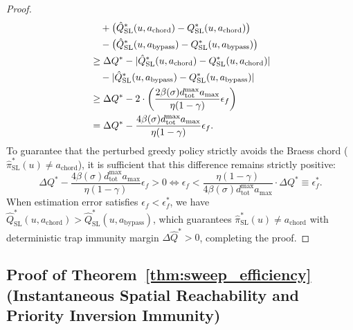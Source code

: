 \documentclass[11pt,a4paper]{article}
\begin{document}
\begin{proof}
\begin{align}
&\quad + \big( \hat{Q}_{\text{SL}}^*(u, a_{\text{chord}}) - Q_{\text{SL}}^*(u, a_{\text{chord}}) \big) \notag \\
&\quad - \big( \hat{Q}_{\text{SL}}^*(u, a_{\text{bypass}}) - Q_{\text{SL}}^*(u, a_{\text{bypass}}) \big) \notag \\
&\ge \Delta Q^* - |\hat{Q}_{\text{SL}}^*(u, a_{\text{chord}}) - Q_{\text{SL}}^*(u, a_{\text{chord}})| \notag \\
&\quad - |\hat{Q}_{\text{SL}}^*(u, a_{\text{bypass}}) - Q_{\text{SL}}^*(u, a_{\text{bypass}})| \notag \\
&\ge \Delta Q^* - 2 \cdot \left( \frac{2 \beta(\sigma) d_{\text{tot}}^{\max} a_{\max}}{\eta (1 - \gamma)} \epsilon_f \right) \notag \\
&= \Delta Q^* - \frac{4 \beta(\sigma) d_{\text{tot}}^{\max} a_{\max}}{\eta (1 - \gamma)} \epsilon_f.
\end{align}
To guarantee that the perturbed greedy policy strictly avoids the Braess chord ($\hat{\pi}_{\text{SL}}^*(u) \ne a_{\text{chord}}$), it is sufficient that this difference remains strictly positive:
\begin{equation}
\Delta Q^* - \frac{4 \beta(\sigma) d_{\text{tot}}^{\max} a_{\max}}{\eta (1 - \gamma)} \epsilon_f > 0 \iff \epsilon_f < \frac{\eta (1 - \gamma)}{4 \beta(\sigma) d_{\text{tot}}^{\max} a_{\max}} \cdot \Delta Q^* \equiv \epsilon_f^*.
\end{equation}
When estimation error satisfies $\epsilon_f < \epsilon_f^*$, we have $\hat{Q}_{\text{SL}}^*(u, a_{\text{chord}}) > \hat{Q}_{\text{SL}}^*(u, a_{\text{bypass}})$, which guarantees $\hat{\pi}_{\text{SL}}^*(u) \ne a_{\text{chord}}$ with deterministic trap immunity margin $\Delta \hat{Q}^* > 0$, completing the proof.
\end{proof}

\subsection{Proof of Theorem~\ref{thm:sweep_efficiency} (Instantaneous Spatial Reachability and Priority Inversion Immunity)}
\label{subsec:proof_thm6}
\end{document}

